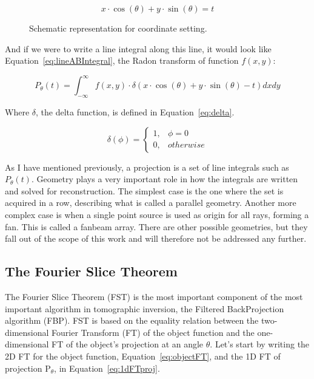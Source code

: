 \begin{equation}
    \label{eq:lineAB}
    x \cdot \cos(\theta) + y \cdot \sin(\theta) = t
\end{equation}

\begin{figure}[htpb]
    \centering
    \caption{Schematic representation for coordinate setting.}
    \label{fig:coordinates}
\end{figure}

And if we were to write a line integral along this line, it would look
like Equation~\ref{eq:lineABIntegral}, the Radon transform of function
$f(x, y)$:

\begin{equation}
    \label{eq:lineABIntegral}
    P_{\theta}(t) = \int_{-\infty}^{\infty} f(x, y) \cdot \delta(x \cdot
    \cos(\theta) + y \cdot \sin(\theta) - t) dxdy
\end{equation}

Where $\delta$, the delta function, is defined in
Equation~\ref{eq:delta}.

\begin{equation}
    \label{eq:delta}
    \delta (\phi) =  
    \begin{cases}
            1, & \phi = 0\\
            0, & otherwise
    \end{cases}
\end{equation}

As I have mentioned previously, a projection is a set of line integrals
such as $P_{\theta}(t)$. Geometry plays a very important role in how the
integrals are written and solved for reconstruction. The simplest case
is the one where the set is acquired in a row, describing what is called
a parallel geometry. Another more complex case is when a single point
source is used as origin for all rays, forming a fan. This is called a
fanbeam array. There are other possible geometries, but they fall out of
the scope of this work and will therefore not be addressed any further.

\subsection{The Fourier Slice Theorem}%
\label{sub:the_fourier_slice_theorem}

The Fourier Slice Theorem (\gls{FST}) is the most important component of
the most important algorithm in tomographic inversion, the Filtered
BackProjection algorithm (\gls{FBP}). \gls{FST} is based on the equality
relation between the 
two-dimensional Fourier Transform (\gls{FT}) of the object function and
the one-dimensional \gls{FT} of the object's projection at an angle
$\theta$. Let's start by writing the 2D \gls{FT} for the object
function, Equation~\ref{eq:objectFT}, and the 1D \gls{FT} of projection
P$_\theta$, in Equation~\ref{eq:1dFTproj}.

